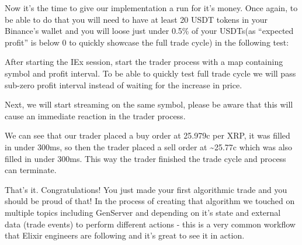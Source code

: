 \documentclass[
]{book}
\newenvironment{Shaded}{\begin{snugshade}}{\end{snugshade}}
\newcommand{\AttributeTok}[1]{\textcolor[rgb]{0.77,0.63,0.00}{#1}}
\newcommand{\CommentTok}[1]{\textcolor[rgb]{0.56,0.35,0.01}{\textit{#1}}}
\newcommand{\ErrorTok}[1]{\textcolor[rgb]{0.64,0.00,0.00}{\textbf{#1}}}
\newcommand{\ExtensionTok}[1]{#1}
\newcommand{\KeywordTok}[1]{\textcolor[rgb]{0.13,0.29,0.53}{\textbf{#1}}}
\newcommand{\NormalTok}[1]{#1}
\newcommand{\OperatorTok}[1]{\textcolor[rgb]{0.81,0.36,0.00}{\textbf{#1}}}
\newcommand{\StringTok}[1]{\textcolor[rgb]{0.31,0.60,0.02}{#1}}
\begin{document}
Now it's the time to give our implementation a run for it's money. Once again, to be able to do that you will need to have at least 20 USDT tokens in your Binance's wallet and you will loose just under 0.5\% of your USDTs(as ``expected profit'' is below 0 to quickly showcase the full trade cycle) in the following test:

\begin{Shaded}
\end{Shaded}

After starting the IEx session, start the trader process with a map containing symbol and profit interval. To be able to quickly test full trade cycle we will pass sub-zero profit interval instead of waiting for the increase in price.

Next, we will start streaming on the same symbol, please be aware that this will cause an immediate reaction in the trader process.

We can see that our trader placed a buy order at 25.979c per XRP, it was filled in under 300ms, so then the trader placed a sell order at \textasciitilde25.77c
which was also filled in under 300ms. This way the trader finished the trade
cycle and process can terminate.

That's it. Congratulations! You just made your first algorithmic trade and you should be proud of that! In the process of creating that algorithm we touched on multiple topics including GenServer and depending on it's state and external data (trade events) to perform different actions - this is a very common workflow that Elixir engineers are following and it's great to see it in action.
\end{document}
